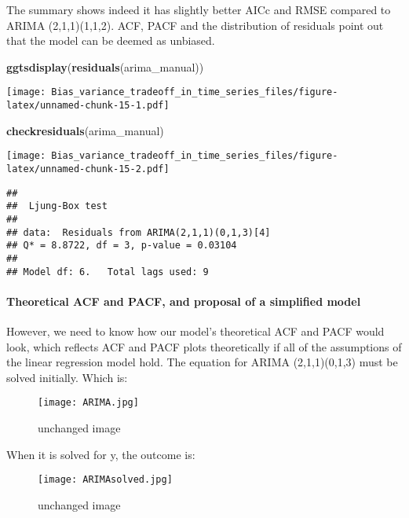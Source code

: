 \documentclass[
]{article}
\newenvironment{Shaded}{\begin{snugshade}}{\end{snugshade}}
\newcommand{\KeywordTok}[1]{\textcolor[rgb]{0.13,0.29,0.53}{\textbf{#1}}}
\newcommand{\NormalTok}[1]{#1}
\begin{document}
The summary shows indeed it has slightly better AICc and RMSE compared
to ARIMA (2,1,1)(1,1,2). ACF, PACF and the distribution of residuals
point out that the model can be deemed as unbiased.

\begin{Shaded}
\begin{Highlighting}[]
\KeywordTok{ggtsdisplay}\NormalTok{(}\KeywordTok{residuals}\NormalTok{(arima_manual))}
\end{Highlighting}
\end{Shaded}

\texttt{[image: Bias\_variance\_tradeoff\_in\_time\_series\_files/figure-latex/unnamed-chunk-15-1.pdf]}

\begin{Shaded}
\begin{Highlighting}[]
\KeywordTok{checkresiduals}\NormalTok{(arima_manual)}
\end{Highlighting}
\end{Shaded}

\texttt{[image: Bias\_variance\_tradeoff\_in\_time\_series\_files/figure-latex/unnamed-chunk-15-2.pdf]}

\begin{verbatim}
## 
##  Ljung-Box test
## 
## data:  Residuals from ARIMA(2,1,1)(0,1,3)[4]
## Q* = 8.8722, df = 3, p-value = 0.03104
## 
## Model df: 6.   Total lags used: 9
\end{verbatim}

\hypertarget{theoretical-acf-and-pacf-and-proposal-of-a-simplified-model}{%
\paragraph{Theoretical ACF and PACF, and proposal of a simplified
model}\label{theoretical-acf-and-pacf-and-proposal-of-a-simplified-model}}

However, we need to know how our model's theoretical ACF and PACF would
look, which reflects ACF and PACF plots theoretically if all of the
assumptions of the linear regression model hold. The equation for ARIMA
(2,1,1)(0,1,3) must be solved initially. Which is:

\begin{figure}
\centering
\texttt{[image: ARIMA.jpg]}
\caption{unchanged image}
\end{figure}

When it is solved for y, the outcome is:

\begin{figure}
\centering
\texttt{[image: ARIMAsolved.jpg]}
\caption{unchanged image}
\end{figure}
\end{document}
